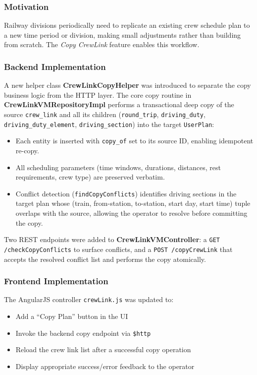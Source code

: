 \documentclass[12pt,a4paper]{article}
\begin{document}
\subsubsection{Motivation}

Railway divisions periodically need to replicate an existing crew schedule plan
to a new time period or division, making small adjustments rather than building
from scratch. The \textit{Copy CrewLink} feature enables this workflow.

\subsubsection{Backend Implementation}

A new helper class \textbf{CrewLinkCopyHelper} was introduced to separate the
copy business logic from the HTTP layer. The core copy routine in
\textbf{CrewLinkVMRepositoryImpl} performs a transactional deep copy of the
source \texttt{crew\_link} and all its children (\texttt{round\_trip},
\texttt{driving\_duty}, \texttt{driving\_duty\_element},
\texttt{driving\_section}) into the target \texttt{UserPlan}:

\begin{itemize}[leftmargin=1.5em]
    \item Each entity is inserted with \texttt{copy\_of} set to its source ID,
          enabling idempotent re-copy.
    \item All scheduling parameters (time windows, durations, distances,
          rest requirements, crew type) are preserved verbatim.
    \item Conflict detection (\texttt{findCopyConflicts}) identifies driving
          sections in the target plan whose (train, from-station, to-station,
          start day, start time) tuple overlaps with the source, allowing the
          operator to resolve before committing the copy.
\end{itemize}

Two REST endpoints were added to \textbf{CrewLinkVMController}: a
\texttt{GET /checkCopyConflicts} to surface conflicts, and a
\texttt{POST /copyCrewLink} that accepts the resolved conflict list and
performs the copy atomically.

\subsubsection{Frontend Implementation}

The AngularJS controller \texttt{crewLink.js} was updated to:
\begin{itemize}[leftmargin=1.5em]
    \item Add a ``Copy Plan'' button in the UI
    \item Invoke the backend copy endpoint via \texttt{\$http}
    \item Reload the crew link list after a successful copy operation
    \item Display appropriate success/error feedback to the operator
\end{itemize}
\end{document}
